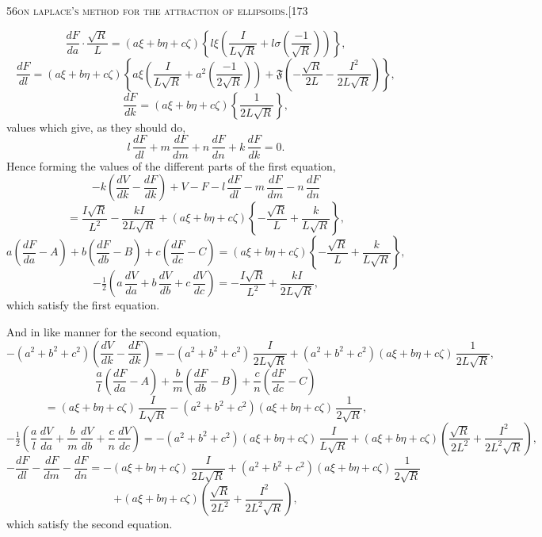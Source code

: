 \documentclass[11pt]{article}
\begin{document}
\newpage

\begin{center}
\small\textsc{56}\hfill\textsc{on laplace's method for the attraction of ellipsoids.}\hfill[173
\end{center}

\medskip

\[
\frac{dF}{da} \cdot \frac{\sqrt{R}}{L} = (a\xi + b\eta + c\zeta)\left\{l\xi\left(\frac{I}{L\sqrt{R}} + l\sigma\left(\frac{-1}{\sqrt{R}}\right)\right)\right\},
\]
\[
\frac{dF}{dl} = (a\xi + b\eta + c\zeta)\left\{a\xi\left(\frac{I}{L\sqrt{R}} + a^{2}\left(\frac{-1}{2\sqrt{R}}\right)\right) + \mathfrak{F}\left(-\frac{\sqrt{R}}{2L} - \frac{I^{2}}{2L\sqrt{R}}\right)\right\},
\]
\[
\frac{dF}{dk} = (a\xi + b\eta + c\zeta)\left\{\frac{1}{2L\sqrt{R}}\right\},
\]
values which give, as they should do,
\[
l\,\frac{dF}{dl} + m\,\frac{dF}{dm} + n\,\frac{dF}{dn} + k\,\frac{dF}{dk} = 0.
\]
Hence forming the values of the different parts of the first equation,
\[
- k\left(\frac{dV}{dk} - \frac{dF}{dk}\right) + V - F - l\,\frac{dF}{dl} - m\,\frac{dF}{dm} - n\,\frac{dF}{dn}
\]
\[
= \frac{I\sqrt{R}}{L^{2}} - \frac{kI}{2L\sqrt{R}} + (a\xi + b\eta + c\zeta)\left\{-\frac{\sqrt{R}}{L} + \frac{k}{L\sqrt{R}}\right\},
\]
\[
a\left(\frac{dF}{da} - A\right) + b\left(\frac{dF}{db} - B\right) + c\left(\frac{dF}{dc} - C\right) = (a\xi + b\eta + c\zeta)\left\{- \frac{\sqrt{R}}{L} + \frac{k}{L\sqrt{R}}\right\},
\]
\[
- \tfrac{1}{2}\left(a\,\frac{dV}{da} + b\,\frac{dV}{db} + c\,\frac{dV}{dc}\right) = - \frac{I\sqrt{R}}{L^{2}} + \frac{kI}{2L\sqrt{R}},
\]
which satisfy the first equation.

And in like manner for the second equation,
\[
- (a^{2} + b^{2} + c^{2})\left(\frac{dV}{dk} - \frac{dF}{dk}\right) = - (a^{2} + b^{2} + c^{2})\,\frac{I}{2L\sqrt{R}} + (a^{2} + b^{2} + c^{2})(a\xi + b\eta + c\zeta)\,\frac{1}{2L\sqrt{R}},
\]
\[
\frac{a}{l}\left(\frac{dF}{da} - A\right) + \frac{b}{m}\left(\frac{dF}{db} - B\right) + \frac{c}{n}\left(\frac{dF}{dc} - C\right)
\]
\[
= (a\xi + b\eta + c\zeta)\,\frac{I}{L\sqrt{R}} - (a^{2} + b^{2} + c^{2})(a\xi + b\eta + c\zeta)\,\frac{1}{2\sqrt{R}},
\]
\[
- \tfrac{1}{2}\left(\frac{a}{l}\,\frac{dV}{da} + \frac{b}{m}\,\frac{dV}{db} + \frac{c}{n}\,\frac{dV}{dc}\right) = - (a^{2} + b^{2} + c^{2})(a\xi + b\eta + c\zeta)\,\frac{I}{L\sqrt{R}} + (a\xi + b\eta + c\zeta)\left(\frac{\sqrt{R}}{2L^{2}} + \frac{I^{2}}{2L^{2}\sqrt{R}}\right),
\]
\[
- \frac{dF}{dl} - \frac{dF}{dm} - \frac{dF}{dn} = - (a\xi + b\eta + c\zeta)\,\frac{I}{2L\sqrt{R}} + (a^{2} + b^{2} + c^{2})(a\xi + b\eta + c\zeta)\,\frac{1}{2\sqrt{R}}
\]
\[
+ (a\xi + b\eta + c\zeta)\left(\frac{\sqrt{R}}{2L^{2}} + \frac{I^{2}}{2L^{2}\sqrt{R}}\right),
\]
which satisfy the second equation.
\end{document}
